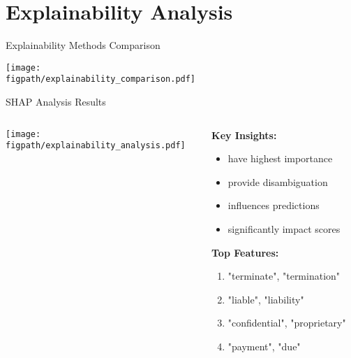 
\section{Explainability Analysis}

\begin{frame}{Explainability Methods Comparison}
\begin{center}
\texttt{[image: \\figpath/explainability\_comparison.pdf]}
\end{center}
\end{frame}

\begin{frame}{SHAP Analysis Results}
\begin{columns}
\begin{column}{0.6\textwidth}
\begin{center}
\texttt{[image: \\figpath/explainability\_analysis.pdf]}
\end{center}
\end{column}
\begin{column}{0.4\textwidth}
\textbf{Key Insights:}
\begin{itemize}
    \item {} have highest importance
    \item {} provide disambiguation
    \item {} influences predictions
    \item {} significantly impact scores
\end{itemize}

\vspace{0.5cm}
\textbf{Top Features:}
\begin{enumerate}
    \item "terminate", "termination"
    \item "liable", "liability" 
    \item "confidential", "proprietary"
    \item "payment", "due"
\end{enumerate}
\end{column}
\end{columns}
\end{frame}

